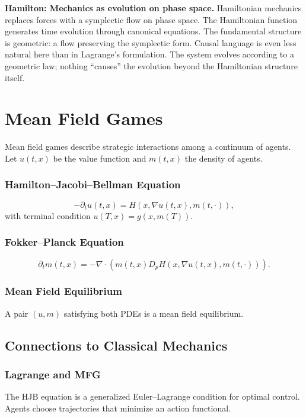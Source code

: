 \documentclass[12pt]{article}
\begin{document}
\textbf{Hamilton: Mechanics as evolution on phase space.} Hamiltonian mechanics replaces forces with a symplectic flow on phase space. The Hamiltonian function generates time evolution through canonical equations. The fundamental structure is geometric: a flow preserving the symplectic form. Causal language is even less natural here than in Lagrange's formulation. The system evolves according to a geometric law; nothing ``causes'' the evolution beyond the Hamiltonian structure itself.




\section{Mean Field Games}

Mean field games describe strategic interactions among a continuum of agents. Let $u(t, x)$ be the value function and $m(t, x)$ the density of agents.

\subsubsection{Hamilton--Jacobi--Bellman Equation}
\[
-\partial_t u(t, x) = H\left(x, \nabla u(t, x), m(t, \cdot)\right),
\]
with terminal condition $u(T, x) = g(x, m(T))$.

\subsubsection{Fokker--Planck Equation}
\[
\partial_t m(t, x) = -\nabla \cdot \left(m(t, x) D_p H(x, \nabla u(t, x), m(t, \cdot))\right).
\]

\subsubsection{Mean Field Equilibrium}

A pair $(u, m)$ satisfying both PDEs is a mean field equilibrium.


\subsection{Connections to Classical Mechanics}

\subsubsection{Lagrange and MFG}

The HJB equation is a generalized Euler--Lagrange condition for optimal control. Agents choose trajectories that minimize an action functional.
\end{document}
